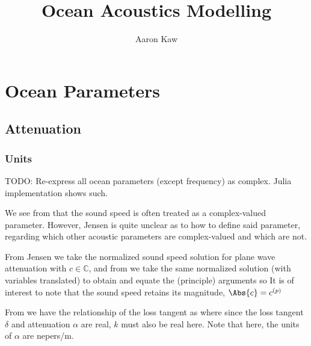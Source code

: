 \documentclass{report}
\title{Ocean Acoustics Modelling}
\author{Aaron Kaw}
\date{}
\newcommand{\bbC}{\mathbb{C}}
\begin{document}
\maketitle
\tableofcontents

\chapter{Ocean Parameters}
\section{Attenuation}
\subsection{Units}
TODO: Re-express all ocean parameters (except frequency) as complex. Julia implementation shows such.

We see from \cite{jensen2011computational} that the sound speed is often treated as a complex-valued parameter. However, Jensen is quite unclear as to how to define said parameter, regarding which other acoustic parameters are complex-valued and which are not.

From Jensen we take the normalized sound speed solution for plane wave attenuation
with $c \in \bbC$, and from \cite{buckingham1997theory} we take the same normalized solution (with variables translated) to obtain
and equate the (principle) arguments so
It is of interest to note that the sound speed retains its magnitude, $\Abs{c} = c^{(p)}$

From \cite{jensen2011computational} we have the relationship of the loss tangent as
where since the loss tangent $\delta$ and attenuation $\alpha$ are real, $k$ must also be real here. Note that here, the units of $\alpha$ are nepers/m.
\end{document}
